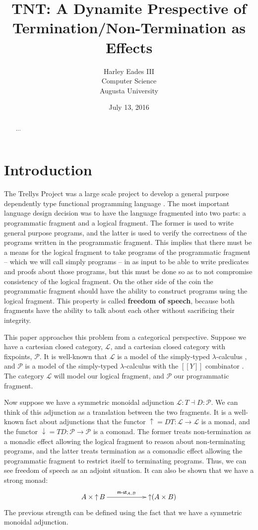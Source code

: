 \documentclass{article}
\title{TNT: A Dynamite Prespective of Termination/Non-Termination as Effects}
\author{Harley Eades III\\Computer Science\\Augusta University}
\date{July 13, 2016}
\let\to\rightarrow
\newcommand{\cat}[1]{\mathcal{#1}}
\newcommand{\uar}[0]{\mathop{\uparrow}}
\newcommand{\dar}[0]{\mathop{\downarrow}}
\newcommand{\mst}[1]{\mathsf{m\text{-}st}_{#1}}
\begin{document}
\maketitle

\begin{abstract}
  ... 
\end{abstract}

\section{Introduction}
\label{sec:introduction}

The Trellys Project was a large scale project to develop a general
purpose dependently type functional programming language \cite{??}.
The most important language design decision was to have the language
fragmented into two parts: a programmatic fragment and a logical
fragment.  The former is used to write general purpose programs, and
the latter is used to verify the correctness of the programs written
in the programmatic fragment.  This implies that there must be a means
for the logical fragment to take programs of the programmatic fragment
-- which we will call simply programs -- in as input to be able to
write predicates and proofs about those programs, but this must be
done so as to not compromise consistency of the logical fragment.  On
the other side of the coin the programmatic fragment should have the
ability to construct programs using the logical fragment.  This
property is called \textbf{freedom of speech}, because both fragments
have the ability to talk about each other without sacrificing their
integrity.

This paper approaches this problem from a categorical
perspective. Suppose we have a cartesian closed category, $\cat{L}$,
and a cartesian closed category with fixpoints, $\cat{P}$.  It is
well-known that $\cat{L}$ is a model of the simply-typed
$\lambda$-calculus \cite{?}, and $\cat{P}$ is a model of the
simply-typed $\lambda$-calculus with the $[[Y]]$ combinator \cite{?}.
The category $\cat{L}$ will model our logical fragment, and $\cat{P}$
our programmatic fragment.

Now suppose we have a symmetric monoidal adjunction $\cat{L} : T
\dashv D : \cat{P}$. We can think of this adjunction as a translation
between the two fragments.  It is a well-known fact about adjunctions
that the functor $\uar = DT : \cat{L} \to \cat{L}$ is a monad, and the
functor $\dar = TD : \cat{P} \to \cat{P}$ is a comonad.  The former
treats non-termination as a monadic effect allowing the logical
fragment to reason about non-terminating programs, and the latter
treats termination as a comonadic effect allowing the programmatic
fragment to restrict itself to terminating programs.  Thus, we can see
freedom of speech as an adjoint situation.  It can also be shown that
we have a strong monad:
\[
\bfig
\morphism<1000,0>[A \times \uar B`\uar(A \times B);\mst{A,B}]
\efig
\]
The previous strength can be defined using the fact that we have a
symmetric monoidal adjunction.
\end{document}
